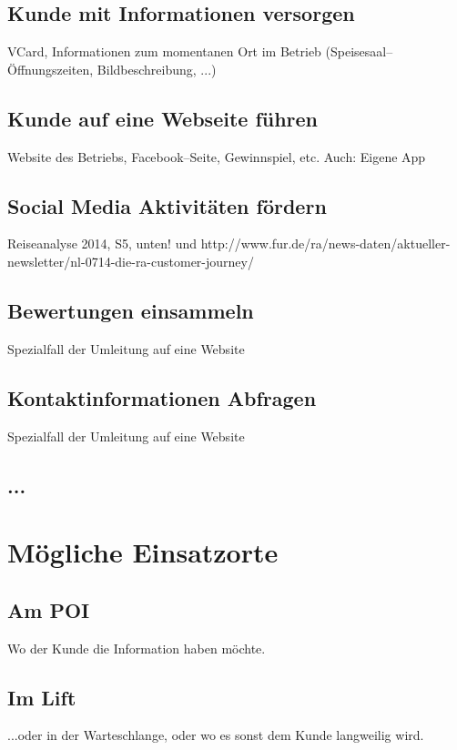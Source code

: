 \subsection{Kunde mit Informationen versorgen}

VCard, Informationen zum momentanen Ort im Betrieb (Speisesaal--Öffnungszeiten, Bildbeschreibung, ...)

\subsection{Kunde auf eine Webseite führen}
Website des Betriebs, Facebook--Seite, Gewinnspiel, etc.
Auch: Eigene App

\subsection{Social Media Aktivitäten fördern}
Reiseanalyse 2014, S5, unten! und http://www.fur.de/ra/news-daten/aktueller-newsletter/nl-0714-die-ra-customer-journey/ 

\subsection{Bewertungen einsammeln}
Spezialfall der Umleitung auf eine Website

\subsection{Kontaktinformationen Abfragen}
Spezialfall der Umleitung auf eine Website

\subsection{...}

\section{Mögliche Einsatzorte}
\label{sec:einsatzorte}

\subsection{Am POI}
Wo der Kunde die Information haben möchte.

\subsection{Im Lift}
...oder in der Warteschlange, oder wo es sonst dem Kunde langweilig wird.

